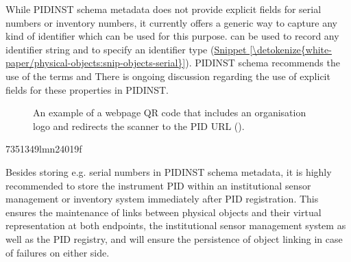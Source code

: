\documentclass[a4paper,10pt,english]{sphinxmanual}
\begin{document}
\sphinxAtStartPar
While PIDINST schema metadata does not provide explicit fields for
serial numbers or inventory numbers, it currently offers a generic way
to capture any kind of identifier which can be used for this purpose.
 can be used to record any identifier string and
 to specify an identifier type
(\hyperref[\detokenize{white-paper/physical-objects:snip-objects-serial}]{Snippet \ref{\detokenize{white-paper/physical-objects:snip-objects-serial}}}). PIDINST schema recommends the use of
the terms  and  There is on\sphinxhyphen{}going
discussion regarding the use of explicit fields for these properties
in PIDINST.

\begin{figure}[htbp]
\centering
\capstart

\noindent{}
\caption{An example of a webpage QR code that includes an organisation logo
and re\sphinxhyphen{}directs the scanner to the PID URL
().}\label{\detokenize{white-paper/physical-objects:fig-objects-qr}}\end{figure}
\def\sphinxLiteralBlockLabel{\label{\detokenize{white-paper/physical-objects:snip-objects-serial}}}
\begin{sphinxVerbatim}[commandchars=\\\{\}]
      7351\PYGZhy{}349l\PYGZhy{}mn24\PYGZhy{}019f
\end{sphinxVerbatim}

\sphinxAtStartPar
Besides storing e.g. serial numbers in PIDINST schema metadata, it is
highly recommended to store the instrument PID within an institutional
sensor management or inventory system immediately after PID
registration. This ensures the maintenance of links between physical
objects and their virtual representation at both endpoints, the
institutional sensor management system as well as the PID registry, and
will ensure the persistence of object linking in case of failures on
either side.
\end{document}
